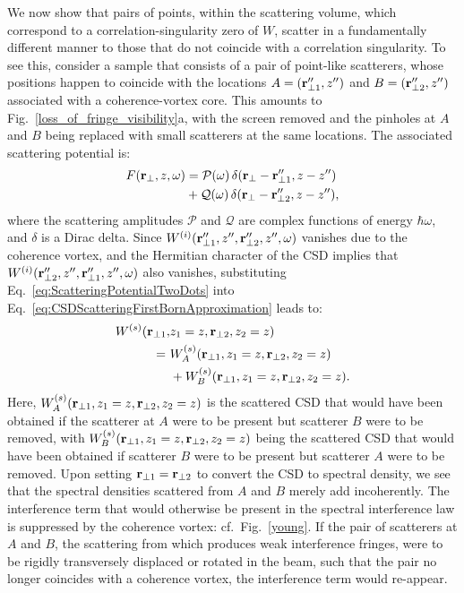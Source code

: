 \documentclass[%
 reprint,
 amsmath,amssymb,
 aps,
]{revtex4-1}
\begin{document}
We now show that pairs of points, within the scattering volume, which correspond to a correlation-singularity zero of $W$, scatter in a fundamentally different manner to those that do not coincide with a correlation singularity.  To see this, consider a sample that consists of a pair of point-like scatterers, whose positions happen to coincide with the locations $A=({\bf r}_{\perp 1}'',z'')$ and $B=({\bf r}_{\perp 2}'',z'')$ associated with a coherence-vortex core. This amounts to Fig.~\ref{loss_of_fringe_visibility}a, with the screen removed and the pinholes at $A$ and $B$ being replaced with small scatterers at the same locations.  The associated scattering potential is:
\begin{equation}
\begin{aligned}
F({\bf r}_{\perp},z,\omega) &= \mathcal{P}(\omega)\, \delta({\bf r}_{\perp}-{\bf r}_{\perp 1}'',z-z'') \\ &+ \mathcal{Q}(\omega) \,\delta({\bf r}_{\perp}-{\bf r}_{\perp 2}'',z-z''),
\label{eq:ScatteringPotentialTwoDots}
\end{aligned}
\end{equation}
where the scattering amplitudes $\mathcal{P}$ and $\mathcal{Q}$ are complex functions of energy $\hbar\omega$, and $\delta$ is a Dirac delta.   Since $W^{(i)}({\bf r}_{\perp 1}'',z'',{\bf r}_{\perp 2}'',z'',\omega)$ vanishes due to the coherence vortex, and the Hermitian character of the CSD \cite{mandel_wolf} implies that $W^{(i)}({\bf r}_{\perp 2}'',z'',{\bf r}_{\perp 1}'',z'',\omega)$ also vanishes, substituting Eq.~\ref{eq:ScatteringPotentialTwoDots} into Eq.~\ref{eq:CSDScatteringFirstBornApproximation} leads to:
\begin{equation}
\begin{aligned}
\label{eq:CSDsforTwoScattersAtCVCore}
W^{(s)} ({\bf r}_{\perp 1}, &z_1=z, {\bf r}_{\perp 2},z_2=z) \\ = ~ &W^{(s)}_A ({\bf r}_{\perp 1}, z_1=z,  {\bf r}_{\perp 2},z_2=z) \\ &+ W^{(s)}_B ({\bf r}_{\perp 1}, z_1=z, {\bf r}_{\perp 2},z_2=z).
\end{aligned}
\end{equation}
Here, $W^{(s)}_A ({\bf r}_{\perp 1}, z_1=z, {\bf r}_{\perp 2},z_2=z)$ is the scattered CSD that would have been obtained if the scatterer at $A$ were to be present but scatterer $B$ were to be removed, with $W^{(s)}_B ({\bf r}_{\perp 1}, z_1=z, {\bf r}_{\perp 2},z_2=z)$ being the scattered CSD that would have been obtained if scatterer  $B$ were to be present but scatterer  $A$ were to be removed.  Upon setting ${\bf r}_{\perp 1}={\bf r}_{\perp 2}$ to convert the CSD to spectral density, we see that the spectral densities scattered from $A$ and $B$ merely add incoherently.  The interference term that would otherwise be present in the spectral interference law \cite{mandel_wolf} is suppressed by the coherence vortex: cf.~Fig.~\ref{young}.  If the pair of scatterers at $A$ and $B$, the scattering from which produces weak interference fringes, were to be rigidly transversely displaced or rotated in the beam, such that the pair no longer coincides with a coherence vortex, the interference term would re-appear.       
\end{document}
